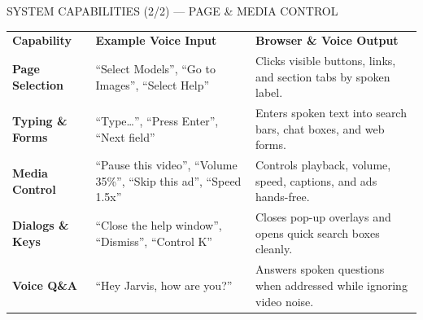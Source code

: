 \documentclass[aspectratio=169,9pt]{beamer}
\begin{document}
\begin{frame}{SYSTEM CAPABILITIES (2/2) --- PAGE \& MEDIA CONTROL}
\renewcommand{\arraystretch}{1.38}
\small
\begin{tabularx}{\textwidth}{@{}p{2.75cm} >{\raggedright\arraybackslash}p{4.65cm} >{\raggedright\arraybackslash}X@{}}
\rowcolor{refSlate}
\textbf{\color{white}Capability} & \textbf{\color{white}Example Voice Input} & \textbf{\color{white}Browser \& Voice Output} \\
\rowcolor{refPage}
\textbf{Page Selection} & ``Select Models'', ``Go to Images'', ``Select Help'' & Clicks visible buttons, links, and section tabs by spoken label. \\
\rowcolor{refSoft}
\textbf{Typing \& Forms} & ``Type\ldots'', ``Press Enter'', ``Next field'' & Enters spoken text into search bars, chat boxes, and web forms. \\
\rowcolor{refPage}
\textbf{Media Control} & ``Pause this video'', ``Volume 35\%'', ``Skip this ad'', ``Speed 1.5x'' & Controls playback, volume, speed, captions, and ads hands-free. \\
\rowcolor{refSoft}
\textbf{Dialogs \& Keys} & ``Close the help window'', ``Dismiss'', ``Control K'' & Closes pop-up overlays and opens quick search boxes cleanly. \\
\rowcolor{refPage}
\textbf{Voice Q\&A} & ``Hey Jarvis, how are you?'' & Answers spoken questions when addressed while ignoring video noise. \\
\hline
\end{tabularx}
\end{frame}
\end{document}
